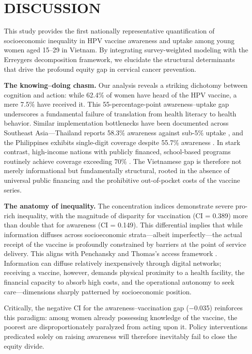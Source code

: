 \chapter{DISCUSSION}

This study provides the first nationally representative quantification of socioeconomic inequality in HPV vaccine awareness and uptake among young women aged 15--29 in Vietnam. By integrating survey-weighted modeling with the Erreygers decomposition framework, we elucidate the structural determinants that drive the profound equity gap in cervical cancer prevention.

\textbf{The knowing--doing chasm.}
Our analysis reveals a striking dichotomy between cognition and action: while 62.4\% of women have heard of the HPV vaccine, a mere 7.5\% have received it. This 55-percentage-point awareness--uptake gap underscores a fundamental failure of translation from health literacy to health behavior. Similar implementation bottlenecks have been documented across Southeast Asia---Thailand reports 58.3\% awareness against sub-5\% uptake \cite{songthap2021}, and the Philippines exhibits single-digit coverage despite 55.7\% awareness \cite{gabuyo2022}. In stark contrast, high-income nations with publicly financed, school-based programs routinely achieve coverage exceeding 70\% \cite{marlow2019}. The Vietnamese gap is therefore not merely informational but fundamentally structural, rooted in the absence of universal public financing and the prohibitive out-of-pocket costs of the vaccine series.

\textbf{The anatomy of inequality.}
The concentration indices demonstrate severe pro-rich inequality, with the magnitude of disparity for vaccination (CI = 0.389) more than double that for awareness (CI = 0.149). This differential implies that while information diffuses across socioeconomic strata---albeit imperfectly---the actual receipt of the vaccine is profoundly constrained by barriers at the point of service delivery. This aligns with Penchansky and Thomas's access framework \cite{penchansky1981}. Information can diffuse relatively inexpensively through digital networks; receiving a vaccine, however, demands physical proximity to a health facility, the financial capacity to absorb high costs, and the operational autonomy to seek care---dimensions sharply patterned by socioeconomic position.

Critically, the negative CI for the awareness--vaccination gap ($-$0.035) reinforces this paradigm: among women already possessing knowledge of the vaccine, the poorest are disproportionately paralyzed from acting upon it. Policy interventions predicated solely on raising awareness will therefore inevitably fail to close the equity divide.

